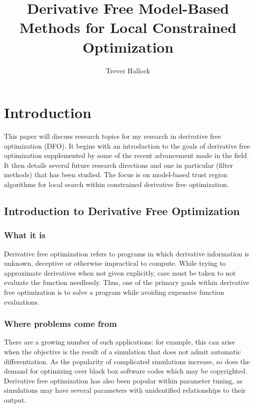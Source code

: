\documentclass{article}
\title{Derivative Free Model-Based Methods for Local Constrained Optimization}
\author{Trever Hallock}
\begin{document}
%
\algnewcommand{\Goto}{\algorithmicgoto\xspace}%
\algnewcommand{\Label}{\State\unskip}


\maketitle


\tableofcontents

\section{Introduction}

This paper will discuss research topics for my research in derivative free optimization (DFO).
It begins with an introduction to the goals of derivative free optimization supplemented by some of the recent advancement made in the field.
It then details several future research directions and one in particular (filter methods) that has been studied.
The focus is on model-based trust region algorithms for local search within constrained derivative free optimization.

\subsection{Introduction to Derivative Free Optimization}
\subsubsection{What it is}

Derivative free optimization refers to programs in which derivative information is unknown, deceptive or otherwise impractical to compute.
While trying to approximate derivatives when not given explicitly, care must be taken to not evaluate the function needlessly.
Thus, one of the primary goals within derivative free optimization is to solve a program while avoiding expensive function evaluations.

\subsubsection{Where problems come from}

There are a growing number of such applications: for example, this can arise when the objective is the result of a simulation that does not admit automatic differentiation.
As the popularity of complicated simulations increase, so does the demand for optimizing over black box software codes which may be copyrighted.
Derivative free optimization has also been popular within parameter tuning, as simulations may have several parameters with unidentified relationships to their output.
\end{document}
